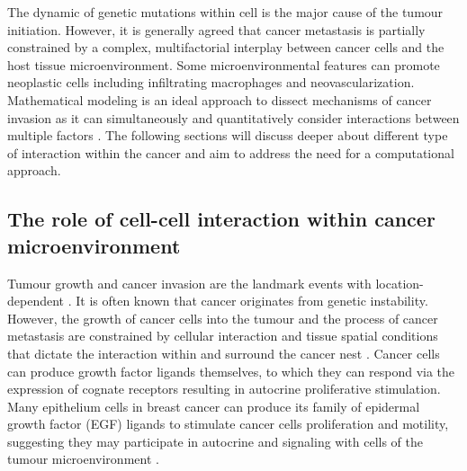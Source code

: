 The dynamic of genetic mutations within cell is the major cause of the tumour initiation. However, it is generally agreed that cancer metastasis is partially constrained by a complex, multifactorial interplay between cancer cells and the host tissue microenvironment. Some microenvironmental features can promote neoplastic cells including infiltrating macrophages and neovascularization. Mathematical modeling is an ideal approach to dissect mechanisms of cancer invasion as it can simultaneously and quantitatively consider interactions between multiple factors \cite{anderson2006tumor}. The following sections will discuss deeper about different type of interaction within the cancer and aim to address the need for a computational approach.       

\subsection{The role of cell-cell interaction within cancer microenvironment}
Tumour growth and cancer invasion are the landmark events with location-dependent \cite{friedl2011cancer}. It is often known that cancer originates from genetic instability. However, the growth of cancer cells into the tumour and the process of cancer metastasis are constrained by cellular interaction and tissue spatial conditions that dictate the interaction within and surround the cancer nest \cite{west2019cellular, liotta2001microenvironment,anderson2006tumor}. Cancer cells can produce growth factor ligands themselves, to which they can respond via the expression of cognate receptors resulting in autocrine proliferative stimulation. Many epithelium cells in breast cancer can produce its family of epidermal growth factor (EGF) ligands to stimulate cancer cells proliferation and motility, suggesting they may participate in autocrine and signaling with cells of the tumour microenvironment \cite{nickerson2013autocrine}.  

